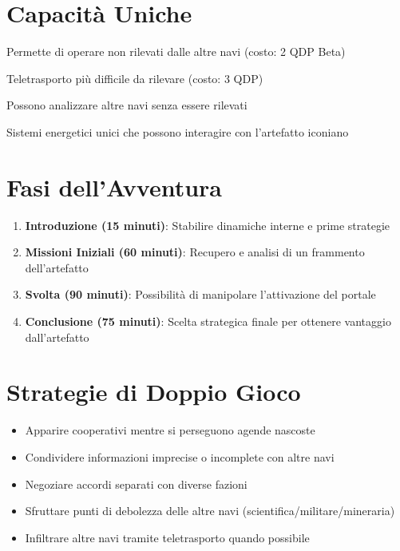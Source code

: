 \documentclass[11pt,a4paper]{article}
\begin{document}
\section{Capacità Uniche}

\begin{tcolorbox}[colback=romlightgreen!10, colframe=romgreen]
\begin{description}[leftmargin=*]
\item[Dispositivo di Occultamento] Permette di operare non rilevati dalle altre navi (costo: 2 QDP Beta)
\item[Infiltrazione Mascherata] Teletrasporto più difficile da rilevare (costo: 3 QDP)
\item[Scansioni Occultate] Possono analizzare altre navi senza essere rilevati
\item[Tecnologia di Singolarità] Sistemi energetici unici che possono interagire con l'artefatto iconiano
\end{description}
\end{tcolorbox}

\section{Fasi dell'Avventura}

\begin{tcolorbox}[colback=romlightgreen!10, colframe=romgreen]
\begin{enumerate}[leftmargin=*]
\item \textbf{Introduzione (15 minuti)}: Stabilire dinamiche interne e prime strategie
\item \textbf{Missioni Iniziali (60 minuti)}: Recupero e analisi di un frammento dell'artefatto
\item \textbf{Svolta (90 minuti)}: Possibilità di manipolare l'attivazione del portale
\item \textbf{Conclusione (75 minuti)}: Scelta strategica finale per ottenere vantaggio dall'artefatto
\end{enumerate}
\end{tcolorbox}

\section{Strategie di Doppio Gioco}

\begin{tcolorbox}[colback=romlightgreen!10, colframe=romgreen]
\begin{itemize}[leftmargin=*]
\item Apparire cooperativi mentre si perseguono agende nascoste
\item Condividere informazioni imprecise o incomplete con altre navi
\item Negoziare accordi separati con diverse fazioni
\item Sfruttare punti di debolezza delle altre navi (scientifica/militare/mineraria)
\item Infiltrare altre navi tramite teletrasporto quando possibile
\end{itemize}
\end{tcolorbox}
\end{document}
